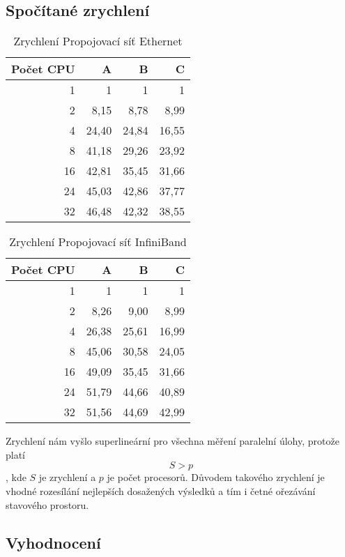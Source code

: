 \documentclass[12pt]{article}
\begin{document}
\subsection{Spočítané zrychlení}
\begin{table}[H]
\begin{center}
\begin{tabular}{|r|r|r|r|}
\hline
Počet CPU & A & B & C\\
\hline
1 & 1 & 1 & 1\\
\hline
2 & 8,15 & 8,78 & 8,99\\
\hline
4 & 24,40 & 24,84 & 16,55\\
\hline
8 & 41,18 & 29,26 & 23,92\\
\hline
16 & 42,81 & 35,45 & 31,66\\
\hline
24 & 45,03 & 42,86 & 37,77\\
\hline
32 & 46,48 & 42,32 & 38,55\\
\hline
\end{tabular}
\end{center}
\caption{Zrychlení Propojovací síť Ethernet}
\end{table}

\begin{table}[H]
\begin{center}
\begin{tabular}{|r|r|r|r|}
\hline
Počet CPU & A & B & C\\
\hline
1 & 1 & 1 & 1\\
\hline
2 & 8,26 & 9,00 & 8,99\\
\hline
4 & 26,38 & 25,61 & 16,99\\
\hline
8 & 45,06 & 30,58 & 24,05\\
\hline
16 & 49,09 & 35,45 & 31,66\\
\hline
24 & 51,79 & 44,66 & 40,89\\
\hline
32 & 51,56 & 44,69 & 42,99\\
\hline
\end{tabular} 
\end{center}
\caption{Zrychlení Propojovací síť InfiniBand}
\end{table}
Zrychlení nám vyšlo superlineární pro všechna měření paralelní úlohy, 
protože platí $$S > p$$, kde \(S\) je zrychlení a \(p\) je počet procesorů. Důvodem takového zrychlení je vhodné rozesílání
nejlepších dosažených výsledků a tím i četné ořezávání stavového prostoru.

\subsection{Vyhodnocení}
\end{document}
